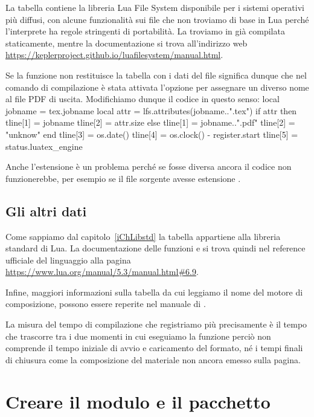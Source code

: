 La tabella  contiene la libreria Lua File System disponibile per i
sistemi operativi più diffusi, con alcune funzionalità sui file che non troviamo
di base in Lua perché l'interprete ha regole stringenti di portabilità. La
troviamo in \LuaTeX{} già compilata staticamente, mentre la documentazione
si trova all'indirizzo web
\url{https://keplerproject.github.io/luafilesystem/manual.html}.

Se la funzione  non restituisce la tabella con i dati del
file significa dunque che nel comando di compilazione è stata attivata l'opzione
 per assegnare un diverso nome al file PDF di uscita.
Modifichiamo dunque il codice in questo senso:
\lines
local jobname = tex.jobname
local attr = lfs.attributes(jobname..".tex")
if attr then
    tline[1] = jobname
    tline[2] = attr.size
else
    tline[1] = jobname..".pdf"
    tline[2] = "unknow"    
end
tline[3] = os.date()
tline[4] = os.clock() - register.start
tline[5] = status.luatex_engine
\endlines
{}

Anche l'estensione  è un problema perché se fosse diversa ancora il
codice non funzionerebbe, per esempio se il file sorgente avesse estensione
.


\subsection{Gli altri dati}

Come sappiamo dal capitolo~\ref{iChLibstd} la tabella  appartiene alla
libreria standard di Lua. La documentazione delle funzioni  e
 si trova quindi nel reference ufficiale del linguaggio alla pagina
\url{https://www.lua.org/manual/5.3/manual.html#6.9}.

Infine, maggiori informazioni sulla tabella  da cui leggiamo il nome
del motore di composizione, possono essere reperite nel manuale di \LuaTeX{}.

La misura del tempo di compilazione che registriamo più precisamente è il tempo
che trascorre tra i due momenti in cui eseguiamo la funzione 
perciò non comprende il tempo iniziale di avvio e caricamento del formato, né
i tempi finali di chiusura come la composizione del materiale non ancora emesso
sulla pagina.


\section{Creare il modulo e il pacchetto}

